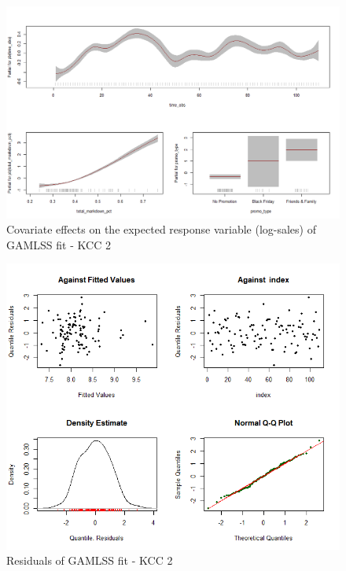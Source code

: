 \begin{figure}[H]
\centering
  \includegraphics[width=0.95\linewidth]{figures/gamlss_effects_kcc_2.png}
  \caption{Covariate effects on the expected response variable (log-sales) of GAMLSS fit - KCC 2}
  \label{fig:gamlss_effects_kcc_2}
\end{figure}




\begin{figure}[H]
\centering
  \includegraphics[width=0.95\linewidth]{figures/gamlss_residuals_kcc_2.png}
  \caption{Residuals of GAMLSS fit - KCC 2}
  \label{fig:gamlss_residuals_kcc_2}
\end{figure}



